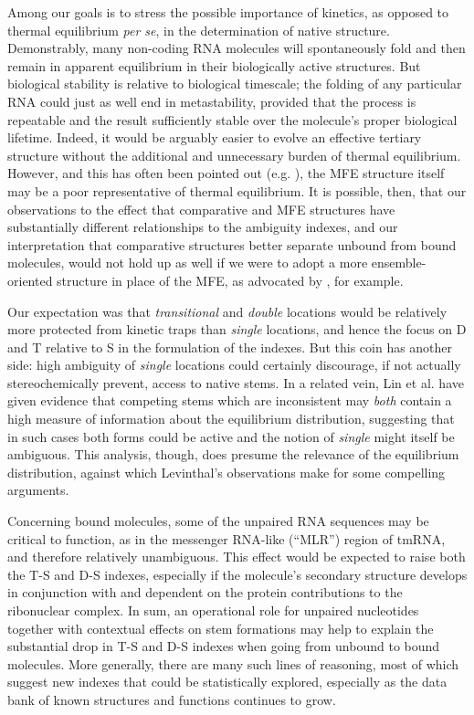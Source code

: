 \documentclass[10pt,letterpaper]{article}
\begin{document}
Among our goals is to stress the possible importance of kinetics, as opposed to thermal equilibrium {\em per se}, in the determination of native structure. Demonstrably, many non-coding RNA molecules will spontaneously fold and then remain in apparent equilibrium in their biologically active structures. 
But biological stability is relative to biological timescale; the folding of any particular RNA could just as well end in metastability, provided that the process is repeatable and the result sufficiently stable over the molecule's proper biological lifetime. Indeed, it would be arguably easier to evolve an effective tertiary structure without the additional and unnecessary burden of thermal equilibrium. 
However, and this has often been pointed out (e.g. \cite{Ding2003-sv, Mathews2006-th}), the MFE structure itself may be a poor representative of thermal equilibrium. It is  possible, then, that our observations to the effect that comparative and MFE structures have substantially different relationships to the ambiguity indexes, and our interpretation that comparative structures better separate unbound from bound molecules, would not hold up as well if we were to adopt a more ensemble-oriented structure in place of the MFE, as advocated by \cite{Ding2005-br}, for example.

Our expectation was that {\em transitional} and {\em double} locations would be relatively more protected from kinetic traps than {\em single} locations, and hence the focus on D and T relative to S in the formulation of the indexes. But this coin has another side: high ambiguity of {\em single} locations could certainly discourage, if not actually stereochemically prevent, access to native stems. In a related vein, Lin et al. \cite{Lin2018-xl} have given evidence that competing stems which are inconsistent may {\em both} contain a high measure of information about the equilibrium distribution, suggesting that in such cases both forms could be active and the notion of {\em single} might itself be ambiguous. This analysis, though, does presume the relevance of the equilibrium distribution, against which Levinthal's observations make for some compelling arguments.

Concerning bound molecules, some of the unpaired RNA sequences may be critical to function, as in the 
messenger RNA-like (``MLR'') region of tmRNA, and therefore relatively unambiguous. 
This effect would be expected to raise both the T-S and D-S indexes, especially if the molecule's secondary structure develops in conjunction with and dependent on the protein contributions to the ribonuclear complex. In sum, 
an operational role for unpaired nucleotides together with contextual effects on stem formations may help to explain the substantial drop in T-S and D-S indexes when going from unbound to bound molecules. More generally, 
there are many such lines of reasoning, most of which suggest new indexes that could be statistically explored, especially as the data bank of known structures and functions continues to grow.
\end{document}
